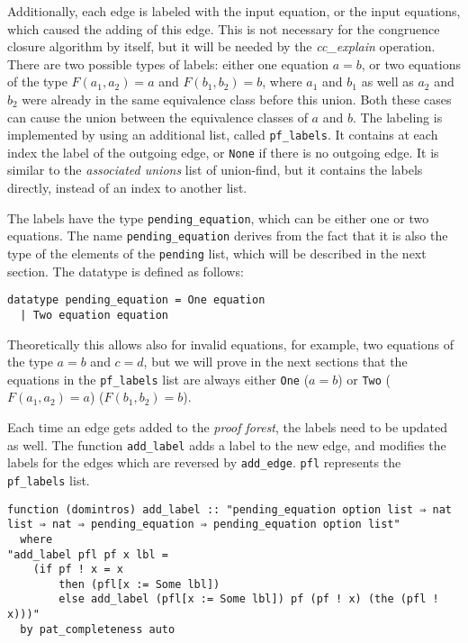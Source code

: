 Additionally, each edge is labeled with the input equation, or the input equations, which caused the adding of this edge. This is not necessary for the congruence closure algorithm by itself, but it will be needed by the \emph{cc\_explain} operation.
There are two possible types of labels: either one equation $a = b$, or two equations of the type $F(a_1, a_2) = a$ and $F(b_1, b_2) = b$, where $a_1$ and $b_1$ as well as $a_2$ and $b_2$ were already in the same equivalence class before this union.
Both these cases can cause the union between the equivalence classes of $a$ and $b$.
The labeling is implemented by using an additional list, called \lstinline|pf_labels|.
It contains at each index the label of the outgoing edge, or \lstinline|None| if there is no outgoing edge.
It is similar to the \emph{associated unions} list of union-find, but it contains the labels directly, instead of an index to another list.

The labels have the type \lstinline|pending_equation|, which can be either one or two equations. The name \lstinline|pending_equation| derives from the fact that it is also the type of the elements of the \lstinline|pending| list, which will be described in the next section. The datatype is defined as follows:

\begin{lstlisting}
datatype pending_equation = One equation
  | Two equation equation
\end{lstlisting}

Theoretically this allows also for invalid equations, for example, two equations of the type $a = b$ and $c = d$, but we will prove in the next sections that the equations in the \lstinline|pf_labels| list are always either \lstinline{One} ($a = b$) or \lstinline{Two} ($F(a_1, a_2) = a$) ($F(b_1, b_2) = b$).

Each time an edge gets added to the \emph{proof forest}, the labels need to be updated as well. The function \lstinline{add_label} adds a label to the new edge, and modifies the labels for the edges which are reversed by \lstinline{add_edge}. \lstinline|pfl| represents the \lstinline|pf_labels| list.

\begin{lstlisting}
function (domintros) add_label :: "pending_equation option list ⇒ nat list ⇒ nat ⇒ pending_equation ⇒ pending_equation option list"
  where
"add_label pfl pf x lbl =
    (if pf ! x = x
        then (pfl[x := Some lbl])
        else add_label (pfl[x := Some lbl]) pf (pf ! x) (the (pfl ! x)))"
  by pat_completeness auto
\end{lstlisting}

